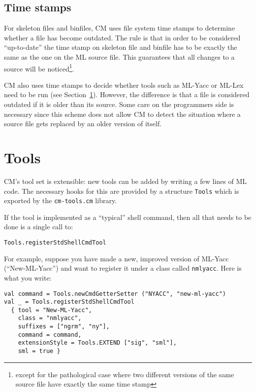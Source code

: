 \documentclass{article}
\begin{document}
\subsection{Time stamps}

For skeleton files and binfiles, CM uses file system time stamps to
determine whether a file has become outdated.  The rule is that in
order to be considered ``up-to-date'' the time stamp on skeleton file
and binfile has to be exactly the same as the one on the ML source
file.  This guarantees that all changes to a source will be
noticed\footnote{except for the pathological case where two different
versions of the same source file have exactly the same time stamp}.

CM also uses time stamps to decide whether tools such as ML-Yacc or
ML-Lex need to be run (see Section~\ref{sec:tools}).  However, the
difference is that a file is considered outdated if it is older than
its source.  Some care on the programmers side is necessary since this
scheme does not allow CM to detect the situation where a source file
gets replaced by an older version of itself.

\section{Tools}
\label{sec:tools}

CM's tool set is extensible: new tools can be added by writing a few
lines of ML code.  The necessary hooks for this are provided by a
structure {\tt Tools} which is exported by the {\tt cm-tools.cm}
library.

If the tool is implemented as a ``typical'' shell command, then all
that needs to be done is a single call to:

\begin{verbatim}
Tools.registerStdShellCmdTool
\end{verbatim}

For example, suppose you have made a
new, improved version of ML-Yacc (``New-ML-Yacc'') and want to
register it under a class called {\tt nmlyacc}.  Here is what you
write:

\begin{verbatim}
val command = Tools.newCmdGetterSetter ("NYACC", "new-ml-yacc")
val _ = Tools.registerStdShellCmdTool
  { tool = "New-ML-Yacc",
    class = "nmlyacc",
    suffixes = ["ngrm", "ny"],
    command = command,
    extensionStyle = Tools.EXTEND ["sig", "sml"],
    sml = true }
\end{verbatim}
\end{document}

